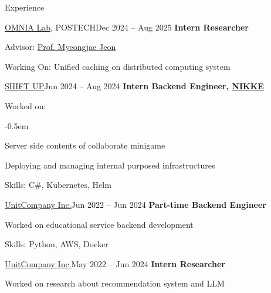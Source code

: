 \documentclass{resume}
\begin{document}
\begin{rSection}{Experience}
    \begin{rSubsection}{\href{https://omnia.postech.ac.kr}{OMNIA Lab}, POSTECH}{Dec 2024 -- Aug 2025}
        \textbf{Intern Researcher}

        \item Advisor: \href{https://sites.google.com/site/myeongjae/}{Prof. Myeongjae Jeon}

        \item Working On: Unified caching on distributed computing system
    \end{rSubsection}

    \begin{rSubsection}{\href{https://shiftup.co.kr/}{SHIFT UP}}{Jun 2024 -- Aug 2024}
        \textbf{Intern Backend Engineer, \href{https://nikke-en.com/}{NIKKE}}

        \item Worked on:

        \vspace{-0.5em}
        \begin{list}{--}{}
            \itemsep -0.5em

            \item Server side contents of collaborate minigame

            \item Deploying and managing internal purposed infrastructures
        \end{list}

        \item Skills: C\#, Kubernetes, Helm
    \end{rSubsection}

    \begin{rSubsection}{\href{https://unitcompany.co.kr}{UnitCompany Inc.}}{Jun 2022 -- Jun 2024}
        \textbf{Part-time Backend Engineer}

        \item Worked on educational service backend development

        \item Skills: Python, AWS, Docker
    \end{rSubsection}

    \begin{rSubsection}{\href{https://unitcompany.co.kr}{UnitCompany Inc.}}{May 2022 -- Jun 2024}
        \textbf{Intern Researcher}

        \item Worked on research about recommendation system and LLM


\end{rSubsection}
\end{rSection}
\end{document}
